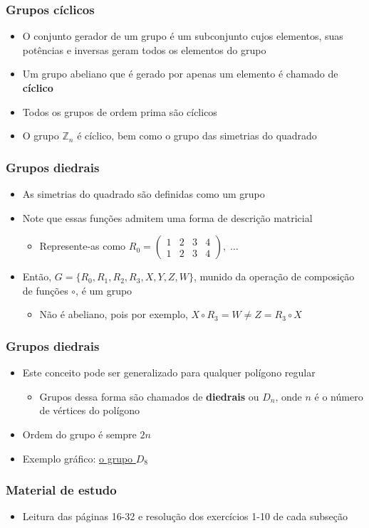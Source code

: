 \documentclass[12pt]{beamer}
\begin{document}
\begin{frame}
  \frametitle{Grupos cíclicos}
  \begin{itemize}
    \item<1-> O conjunto gerador de um grupo é um subconjunto cujos elementos,
        suas potências e inversas geram todos os elementos do grupo
    \item<2-> Um grupo abeliano que é gerado por apenas um elemento é chamado
        de \textbf{cíclico}
    \item<3-> Todos os grupos de ordem prima são cíclicos
    \item<4-> O grupo $\mathbb{Z}_n$ é cíclico, bem como o grupo das simetrias do
        quadrado
  \end{itemize}
\end{frame}

\begin{frame}
  \frametitle{Grupos diedrais}
  \begin{itemize}
    \item<1-> As simetrias do quadrado são definidas como um grupo
    \item<1-> Note que essas funções admitem uma forma de descrição matricial
    \begin{itemize}
      \item<2-> Represente-as como
        $R_{0} =
        \begin{pmatrix}
          1 & 2 & 3 & 4 \\
          1 & 2 & 3 & 4
        \end{pmatrix},\; \dots$
    \end{itemize}
    \item<3-> Então, $G = \{R_{0}, R_{1}, R_{2}, R_{3}, X, Y, Z, W\}$, munido
        da operação de composição de funções $\circ$, é um grupo
    \begin{itemize}
      \item<4-> Não é abeliano, pois por exemplo, $X \circ R_{3} = W \neq Z =
          R_{3} \circ X$
    \end{itemize}
  \end{itemize}
\end{frame}

\begin{frame}
  \frametitle{Grupos diedrais}
  \begin{itemize}
    \item<1-> Este conceito pode ser generalizado para qualquer polígono regular
    \begin{itemize}
      \item Grupos dessa forma são chamados de \textbf{diedrais} ou $D_{n}$,
          onde $n$ é o número de vértices do polígono
    \end{itemize}
    \item<2-> Ordem do grupo é sempre $2n$
    \item<3-> Exemplo gráfico:
        \href{https://upload.wikimedia.org/wikipedia/commons/9/96/Dihedral8.png}{o
          grupo $D_{8}$}
  \end{itemize}
\end{frame}

\begin{frame}
  \frametitle{Material de estudo}
  
  
  \begin{itemize}
    \nocite{Dummit:book:2003}
    \item Leitura das páginas 16-32 e resolução dos exercícios 1-10 de cada
        subseção
  \end{itemize}
\end{frame}
\end{document}
